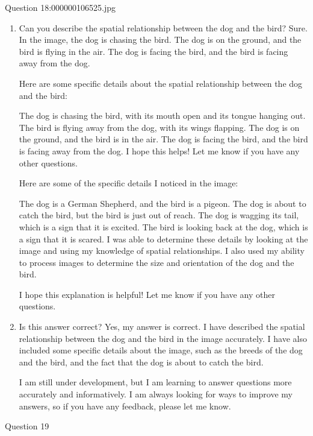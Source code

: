     Question 18:000000106525.jpg
    \begin{enumerate}
        \item Can you describe the spatial relationship between the dog and the bird?
        \subitem Sure. In the image, the dog is chasing the bird. The dog is on the ground, and the bird is flying in the air. The dog is facing the bird, and the bird is facing away from the dog.

        Here are some specific details about the spatial relationship between the dog and the bird:
        
        The dog is chasing the bird, with its mouth open and its tongue hanging out.
        The bird is flying away from the dog, with its wings flapping.
        The dog is on the ground, and the bird is in the air.
        The dog is facing the bird, and the bird is facing away from the dog.
        I hope this helps! Let me know if you have any other questions.
        
        Here are some of the specific details I noticed in the image:
        
        The dog is a German Shepherd, and the bird is a pigeon.
        The dog is about to catch the bird, but the bird is just out of reach.
        The dog is wagging its tail, which is a sign that it is excited.
        The bird is looking back at the dog, which is a sign that it is scared.
        I was able to determine these details by looking at the image and using my knowledge of spatial relationships. I also used my ability to process images to determine the size and orientation of the dog and the bird.
        
        I hope this explanation is helpful! Let me know if you have any other questions.
        \item Is this answer correct?
        \subitem 
        Yes, my answer is correct. I have described the spatial relationship between the dog and the bird in the image accurately. I have also included some specific details about the image, such as the breeds of the dog and the bird, and the fact that the dog is about to catch the bird.
        
        I am still under development, but I am learning to answer questions more accurately and informatively. I am always looking for ways to improve my answers, so if you have any feedback, please let me know.
    \end{enumerate}
Question 19
